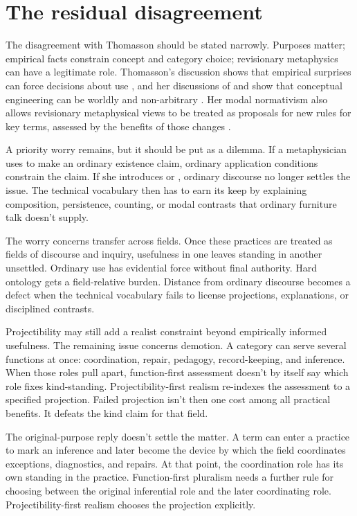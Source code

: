 \documentclass[12pt]{article}
\begin{document}
\section{The residual disagreement}

The disagreement with Thomasson should be stated narrowly. Purposes matter; empirical facts constrain concept and category choice; revisionary metaphysics can have a legitimate role. Thomasson's  discussion shows that empirical surprises can force decisions about use \citep[101--102]{thomasson2020norms}, and her discussions of  and  show that conceptual engineering can be worldly and non-arbitrary \citep[210--217]{thomasson2025rethink}. Her modal normativism also allows revisionary metaphysical views to be treated as proposals for new rules for key terms, assessed by the benefits of those changes \citep[205--206]{thomasson2020norms}.

A priority worry remains, but it should be put as a dilemma. If a metaphysician uses  to make an ordinary existence claim, ordinary application conditions constrain the claim. If she introduces  or , ordinary discourse no longer settles the issue. The technical vocabulary then has to earn its keep by explaining composition, persistence, counting, or modal contrasts that ordinary furniture talk doesn't supply.

The worry concerns transfer across fields. Once these practices are treated as fields of discourse and inquiry, usefulness in one leaves standing in another unsettled. Ordinary use has evidential force without final authority. Hard ontology gets a field-relative burden. Distance from ordinary discourse becomes a defect when the technical vocabulary fails to license projections, explanations, or disciplined contrasts.

Projectibility may still add a realist constraint beyond empirically informed usefulness. The remaining issue concerns demotion. A category can serve several functions at once: coordination, repair, pedagogy, record-keeping, and inference. When those roles pull apart, function-first assessment doesn't by itself say which role fixes kind-standing. Projectibility-first realism re-indexes the assessment to a specified projection. Failed projection isn't then one cost among all practical benefits. It defeats the kind claim for that field.

The original-purpose reply doesn't settle the matter. A term can enter a practice to mark an inference and later become the device by which the field coordinates exceptions, diagnostics, and repairs. At that point, the coordination role has its own standing in the practice. Function-first pluralism needs a further rule for choosing between the original inferential role and the later coordinating role. Projectibility-first realism chooses the projection explicitly.
\end{document}
